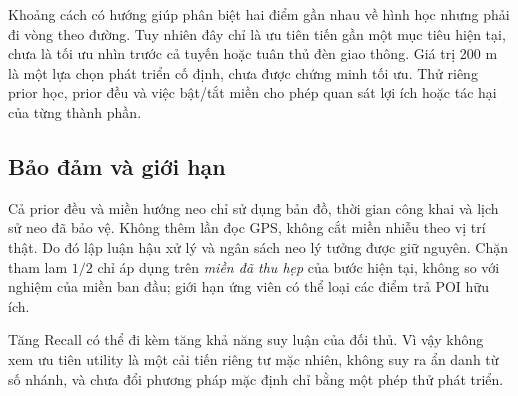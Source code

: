 Khoảng cách có hướng giúp phân biệt hai điểm gần nhau về hình học nhưng phải đi vòng theo đường. Tuy nhiên đây chỉ là ưu tiên tiến gần một mục tiêu hiện tại, chưa là tối ưu nhìn trước cả tuyến hoặc tuân thủ đèn giao thông. Giá trị 200 m là một lựa chọn phát triển cố định, chưa được chứng minh tối ưu. Thử riêng prior học, prior đều và việc bật/tắt miền cho phép quan sát lợi ích hoặc tác hại của từng thành phần.

\subsection{Bảo đảm và giới hạn}

Cả prior đều và miền hướng neo chỉ sử dụng bản đồ, thời gian công khai và lịch sử neo đã bảo vệ. Không thêm lần đọc GPS, không cắt miền nhiễu theo vị trí thật. Do đó lập luận hậu xử lý và ngân sách neo lý tưởng được giữ nguyên. Chặn tham lam $1/2$ chỉ áp dụng trên \emph{miền đã thu hẹp} của bước hiện tại, không so với nghiệm của miền ban đầu; giới hạn ứng viên có thể loại các điểm trả POI hữu ích.

Tăng Recall có thể đi kèm tăng khả năng suy luận của đối thủ. Vì vậy không xem ưu tiên utility là một cải tiến riêng tư mặc nhiên, không suy ra ẩn danh từ số nhánh, và chưa đổi phương pháp mặc định chỉ bằng một phép thử phát triển.
\par\endgroup
